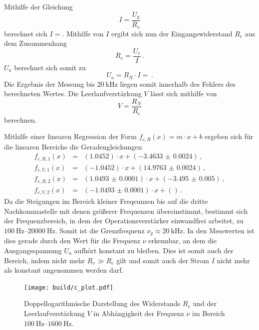 Mithilfe der Gleichung
\begin{equation*}
    I = \frac{U_g}{R_v}
\end{equation*}
berechnet sich $I = $.
Mithilfe von $I$ ergibt sich nun der Eingangswiderstand $R_e$ aus dem Zusammenhang
\begin{equation*}
    R_e = \frac{U_e}{I}\,.
\end{equation*}
$U_a$ berechnet sich somit zu
\begin{equation*}
    U_a = R_N \cdot I =  \,.
\end{equation*}
Die Ergebnis der Messung bis $\SI{20}{\kilo\hertz}$ liegen somit innerhalb des Fehlers des berechneten Wertes.
Die Leerlaufverstärkung $V$ lässt sich mithilfe von 
\begin{equation*}
    V = \frac{R_N}{R_e}
\end{equation*}
berechnen.

Mithilfe einer linearen Regression der Form $f_{c,R}(x) = m \cdot x + b$ ergeben sich für die linearen Bereiche die Geradengleichungen 
\begin{eqnarray*}
    f_{c,R,1}(x) &=& (\num{1.0452}) \cdot x + (\num{-3.4633(24)}) \,, \\
    f_{c,V,1}(x) &=& (\num{-1.0452}) \cdot x + (\num{14.9763(24)}) \,, \\
    f_{c,R,2}(x) &=& (\num{1.0493(1)}) \cdot x + (\num{-3.495(5)}) \,, \\
    f_{c,V,2}(x) &=& (\num{-1.0493(1)}) \cdot x + ( ) \,.
\end{eqnarray*}
Da die Steigungen im Bereich kleiner Freqeunzen bis auf die dritte Nachkommastelle mit denen größerer Frequenzen übereinstimmt, bestimmt sich der Frequenzbereich, in dem der Operationsverstärker einwandfrei arbeitet, zu $\SIrange{100}{20000}{\hertz}$.
Somit ist die Grenzfrequenz $\nu_g \approx \SI{20}{\kilo\hertz}$.
In den Messwerten ist dies gerade durch den Wert für die Frequenz $\nu$ erkennbar, an dem die Ausgangsspannung $U_a$ aufhört konstant zu bleiben.
Dies ist somit auch der Bereich, indem nicht mehr $R_v \gg R_e$ gilt und somit auch der Strom $I$ nicht mehr als konstant angenommen werden darf.

\begin{figure}[h!]
    \centering
    \texttt{[image: build/c\_plot.pdf]}
    \caption{Doppellogarithmische Darstellung des Widerstands $R_e$ und der Leerlaufverstärkung $V$ in Abhängigkeit der Frequenz $\nu$ im Bereich $\SIrange{100}{1600}{\hertz}$.}
    \label{fig:c_plot}
\end{figure}

